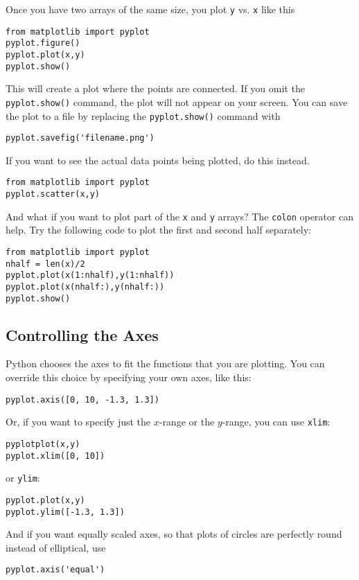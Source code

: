Once you have two arrays of the same size, you plot \texttt{y} vs.
\texttt{x} like this
\begin{Verbatim}
from matplotlib import pyplot
pyplot.figure()
pyplot.plot(x,y)
pyplot.show()
\end{Verbatim}
This will create a plot where the points are connected.  If you omit
the \texttt{pyplot.show()} command, the plot will not appear on your
screen.  You can save the plot to a file by replacing the
\texttt{pyplot.show()}  command with
\begin{Verbatim}
pyplot.savefig('filename.png')
\end{Verbatim}
If you want to see the actual data points being plotted, do this
instead.
\begin{Verbatim}
from matplotlib import pyplot
pyplot.scatter(x,y)
\end{Verbatim}
 And what if you want to plot part
of the \texttt{x} and \texttt{y} arrays? The {\tt colon} operator can
help.  Try the following code to plot the first and second half
separately:
\begin{Verbatim}
from matplotlib import pyplot
nhalf = len(x)/2
pyplot.plot(x(1:nhalf),y(1:nhalf))
pyplot.plot(x(nhalf:),y(nhalf:))
pyplot.show()
\end{Verbatim}

\subsection*{Controlling the Axes}
\label{sec:Axes}

 Python chooses the axes to fit the functions
that you are plotting. You can override this choice by specifying
your own axes, like this:
\begin{Verbatim}
pyplot.axis([0, 10, -1.3, 1.3])
\end{Verbatim}
  Or, if you want to specify just the
$x$-range or the $y$-range, you can use {\tt xlim}:
\begin{Verbatim}
pyplotplot(x,y)
pyplot.xlim([0, 10])
\end{Verbatim}
or {\tt ylim}:
\begin{Verbatim}
pyplot.plot(x,y)
pyplot.ylim([-1.3, 1.3])
\end{Verbatim}
And if you want equally scaled axes, so that plots of circles are
perfectly round instead of elliptical, use
\begin{Verbatim}
pyplot.axis('equal')
\end{Verbatim}
 


